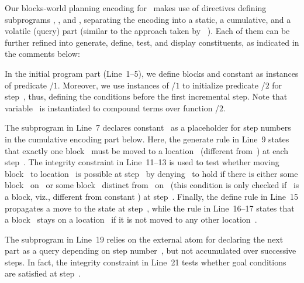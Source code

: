 Our blocks-world planning encoding for \clingo\ makes use of  directives
defining subprograms , , and ,
separating the encoding into a static, a cumulative, and a volatile (query) part
(similar to the approach taken by \iclingo~\cite{gekakaosscth08a}).
Each of them can be further refined into generate, define, test, and display constituents, 
as indicated in the comments below:
%

%
In the initial program  part (Line~1--5),
we define blocks and constant 
as instances of predicate /$1$.
Moreover, we use instances of /$1$
to initialize predicate /$2$ for step~, thus,
defining the conditions before the first incremental step.
Note that variable~ is instantiated to compound terms
over function /$2$.

The  subprogram in Line~7 declares constant~
as a placeholder for step numbers in the cumulative encoding part below.
Here, the generate rule in Line~9 states that exactly one block~
must be moved to a location~ (different from~) at each step~.
The integrity constraint in Line~11--13 is used to test whether
moving block~ to location~ is possible at step~
by denying~ to hold if there
is either some block~ on~ or some block~ distinct from~ on~
(this condition is only checked if~ is a block, viz., different from constant )
at step~.
Finally, the define rule in Line~15 propagates
a move to the state at step~,
while the rule in Line~16--17 states that a block~ stays on a location~
if it is not moved to any other location~.

The  subprogram in Line~19 relies on the external atom  
for declaring the next part as a query depending on step number~, 
but not accumulated over successive steps.
In fact, the integrity constraint in Line~21 tests whether goal conditions are
satisfied at step~.

